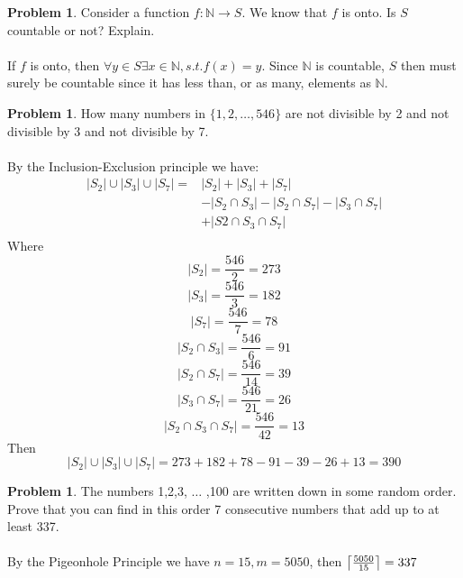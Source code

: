 \documentclass[10pt,leqno ]{article}
\DeclarePairedDelimiter{\ceil}{\lceil}{\rceil}
\theoremstyle{definition}
\newtheorem{problem}[theorem]{Problem}
\begin{document}
\begin{problem} Consider a function $f: \mathbb{N} \to S$.  We know that $f$ is onto.  Is $S$ countable or not?  Explain.
\\\\
\Large
If $f$ is onto, then $\forall y \in S \exists x \in \mathbb{N}, s.t. f(x) = y$.  Since $\mathbb{N}$ is countable, $S$ then must surely be countable since it has less than, or as many, elements as $\mathbb{N}$.
\end{problem}
\newpage

\begin{problem} How many numbers in $\{1,2, \dots ,546\}$ are not divisible by 2 and not divisible by 3 and not divisible by 7.
\\\\
\Large
By the Inclusion-Exclusion principle we have:
\begin{align*}
|S_2| \cup |S_3| \cup |S_7| =& |S_2| + |S_3| + |S_7| \\
                             & - |S_2 \cap S_3| - |S_2 \cap S_7| - |S_3 \cap S_7| \\
                             & + |S2 \cap S_3 \cap S_7|\\
\end{align*}
Where 
$$|S_2| = \frac{546}{2} = 273$$
$$|S_3| = \frac{546}{3} = 182$$
$$|S_7| = \frac{546}{7} = 78$$
$$|S_2 \cap S_3| = \frac{546}{6} = 91$$
$$|S_2 \cap S_7| = \frac{546}{14} = 39$$
$$|S_3 \cap S_7| = \frac{546}{21} = 26$$
$$|S_2 \cap S_3 \cap S_7| = \frac{546}{42} = 13$$
Then
$$|S_2| \cup |S_3| \cup |S_7| = 273 + 182 + 78 - 91 - 39 - 26 + 13 = 390$$
\end{problem}
\newpage

\begin{problem} The numbers 1,2,3, $\dots$ ,100 are written down in some random order.  Prove that you can find in this order 7 consecutive numbers that add up to at least 337.
\\\\
\Large
By the Pigeonhole Principle we have $n = 15, m=5050$, then $\ceil*{\frac{5050}{15}}=337$
\end{problem}
\newpage
\end{document}
